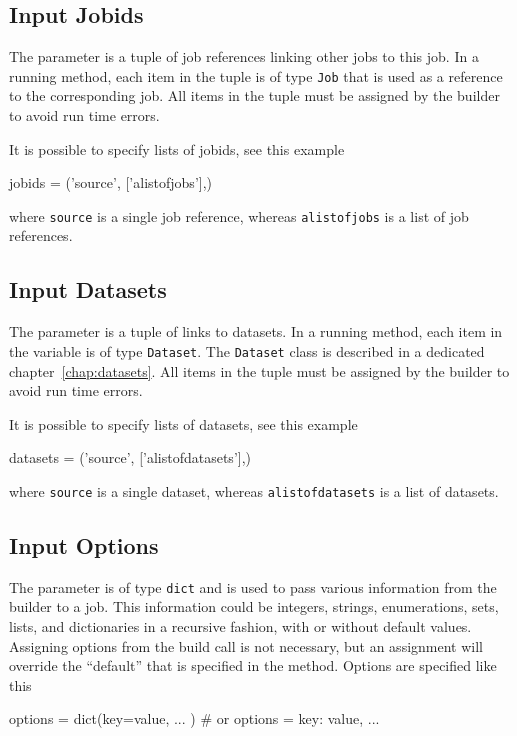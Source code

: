 \subsection{Input Jobids}
The \jobids parameter is a tuple of job references linking other jobs
to this job.  In a running method, each item in the \jobids tuple is
of type \texttt{Job} that is used as a reference to the corresponding
job.  All items in the \jobids tuple must be assigned by the builder
to avoid run time errors.

It is possible to specify lists of jobids, see this example
\begin{python}
jobids = ('source', ['alistofjobs'],)
\end{python}
where \texttt{source} is a single job reference, whereas
\texttt{alistofjobs} is a list of job references.


\subsection{Input Datasets}
The \datasets parameter is a tuple of links to datasets.  In a running
method, each item in the \datasets variable is of type
\texttt{Dataset}.  The \texttt{Dataset} class is described in a
dedicated chapter~\ref{chap:datasets}.  All items in the \datasets
tuple must be assigned by the builder to avoid run time errors.

It is possible to specify lists of datasets, see this example
\begin{python}
datasets = ('source', ['alistofdatasets'],)
\end{python}
where \texttt{source} is a single dataset, whereas
\texttt{alistofdatasets} is a list of datasets.




\subsection{Input Options}

The \options parameter is of type \texttt{dict} and is used to pass
various information from the builder to a job.  This information could
be integers, strings, enumerations, sets, lists, and dictionaries in a
recursive fashion, with or without default values.  Assigning options
from the build call is not necessary, but an assignment will override
the ``default'' that is specified in the method.  Options are
specified like this
\begin{python}
  options = dict(key=value, ... )  # or
  options = {key: value, ...}
\end{python}


